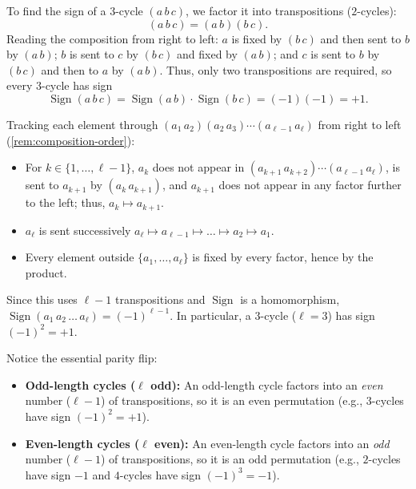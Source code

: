 \begin{content}
To find the sign of a $3$-cycle $(a\,b\,c)$, we factor it into transpositions ($2$-cycles):
\[
(a\,b\,c) = (a\,b)(b\,c).
\]
Reading the composition from right to left: $a$ is fixed by $(b\,c)$ and then sent to $b$ by $(a\,b)$; $b$ is sent to $c$ by $(b\,c)$ and fixed by $(a\,b)$; and $c$ is sent to $b$ by $(b\,c)$ and then to $a$ by $(a\,b)$. Thus, only two transpositions are required, so every $3$-cycle has sign
\[
\operatorname{Sign}(a\,b\,c) = \operatorname{Sign}(a\,b) \cdot \operatorname{Sign}(b\,c) = (-1)(-1) = +1.
\]


\begin{steps}
Tracking each element through $(a_1\,a_2)(a_2\,a_3)\cdots(a_{\ell-1}\,a_\ell)$ from right to left (\cref{rem:composition-order}):
\begin{itemize}
    \item For $k \in \{1, \dots, \ell - 1\}$, $a_k$ does not appear in $(a_{k+1}\,a_{k+2}) \cdots (a_{\ell-1}\,a_\ell)$, is sent to $a_{k+1}$ by $(a_k\,a_{k+1})$, and $a_{k+1}$ does not appear in any factor further to the left; thus, $a_k \mapsto a_{k+1}$.
    \item $a_\ell$ is sent successively $a_\ell \mapsto a_{\ell-1} \mapsto \dots \mapsto a_2 \mapsto a_1$.
    \item Every element outside $\{a_1, \dots, a_\ell\}$ is fixed by every factor, hence by the product.
\end{itemize}
Since this uses $\ell - 1$ transpositions and $\operatorname{Sign}$ is a homomorphism, $\operatorname{Sign}(a_1\,a_2\,\dots\,a_\ell) = (-1)^{\ell - 1}$. In particular, a $3$-cycle ($\ell = 3$) has sign $(-1)^2 = +1$.
\end{steps}

\begin{steps}
Notice the essential parity flip:
\begin{itemize}
    \item \textbf{Odd-length cycles ($\ell$ odd):} An odd-length cycle factors into an \emph{even} number ($\ell - 1$) of transpositions, so it is an even permutation (e.g., $3$-cycles have sign $(-1)^2 = +1$).
    \item \textbf{Even-length cycles ($\ell$ even):} An even-length cycle factors into an \emph{odd} number ($\ell - 1$) of transpositions, so it is an odd permutation (e.g., $2$-cycles have sign $-1$ and $4$-cycles have sign $(-1)^3 = -1$).
\end{itemize}
\end{steps}
\end{content}

